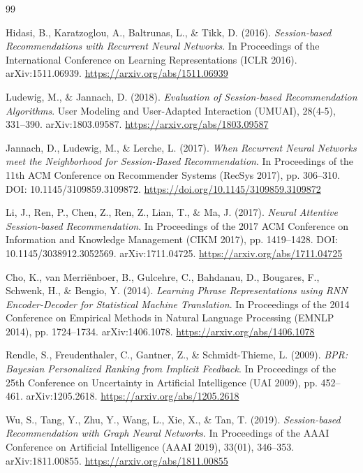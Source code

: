 \documentclass[12pt, a4paper]{article}
\begin{document}
\newpage
\renewcommand{\refname}{TÀI LIỆU THAM KHẢO}
\begin{thebibliography}{99}

Hidasi, B., Karatzoglou, A., Baltrunas, L., \& Tikk, D. (2016).
\textit{Session-based Recommendations with Recurrent Neural Networks}.
In Proceedings of the International Conference on Learning Representations (ICLR 2016).
arXiv:1511.06939. \url{https://arxiv.org/abs/1511.06939}

Ludewig, M., \& Jannach, D. (2018).
\textit{Evaluation of Session-based Recommendation Algorithms}.
User Modeling and User-Adapted Interaction (UMUAI), 28(4-5), 331--390.
arXiv:1803.09587. \url{https://arxiv.org/abs/1803.09587}

Jannach, D., Ludewig, M., \& Lerche, L. (2017).
\textit{When Recurrent Neural Networks meet the Neighborhood for Session-Based Recommendation}.
In Proceedings of the 11th ACM Conference on Recommender Systems (RecSys 2017), pp. 306--310. DOI: 10.1145/3109859.3109872. \url{https://doi.org/10.1145/3109859.3109872}

Li, J., Ren, P., Chen, Z., Ren, Z., Lian, T., \& Ma, J. (2017).
\textit{Neural Attentive Session-based Recommendation}.
In Proceedings of the 2017 ACM Conference on Information and Knowledge Management (CIKM 2017), pp. 1419--1428. DOI: 10.1145/3038912.3052569. arXiv:1711.04725. \url{https://arxiv.org/abs/1711.04725}

Cho, K., van Merriënboer, B., Gulcehre, C., Bahdanau, D., Bougares, F., Schwenk, H., \& Bengio, Y. (2014).
\textit{Learning Phrase Representations using RNN Encoder-Decoder for Statistical Machine Translation}.
In Proceedings of the 2014 Conference on Empirical Methods in Natural Language Processing (EMNLP 2014), pp. 1724--1734. arXiv:1406.1078. \url{https://arxiv.org/abs/1406.1078}

Rendle, S., Freudenthaler, C., Gantner, Z., \& Schmidt-Thieme, L. (2009).
\textit{BPR: Bayesian Personalized Ranking from Implicit Feedback}.
In Proceedings of the 25th Conference on Uncertainty in Artificial Intelligence (UAI 2009), pp. 452--461. arXiv:1205.2618. \url{https://arxiv.org/abs/1205.2618}

Wu, S., Tang, Y., Zhu, Y., Wang, L., Xie, X., \& Tan, T. (2019).
\textit{Session-based Recommendation with Graph Neural Networks}.
In Proceedings of the AAAI Conference on Artificial Intelligence (AAAI 2019), 33(01), 346--353. arXiv:1811.00855. \url{https://arxiv.org/abs/1811.00855}


\end{thebibliography}
\end{document}
